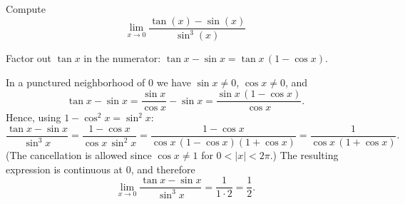 
\begin{question}
Compute
\[ \lim_{x\to0}\frac{\tan(x)-\sin(x)}{\sin^3(x)} \]
\end{question}

\begin{hint}
Factor out $\tan x$ in the numerator: $\tan x-\sin x=\tan x\,(1-\cos x)$.
\end{hint}

\begin{solution}
In a punctured neighborhood of $0$ we have $\sin x\neq0$, $\cos x\neq0$, and
\[ \tan x-\sin x=\frac{\sin x}{\cos x}-\sin x=\frac{\sin x\,(1-\cos x)}{\cos x}. \]
Hence, using $1-\cos^2x=\sin^2x$:
\[ \frac{\tan x-\sin x}{\sin^3x}=\frac{1-\cos x}{\cos x\,\sin^2x}=\frac{1-\cos x}{\cos x\,(1-\cos x)(1+\cos x)}=\frac{1}{\cos x\,(1+\cos x)}. \]
(The cancellation is allowed since $\cos x\neq1$ for $0<|x|<2\pi$.) The resulting expression is continuous at $0$, and therefore
\[ \lim_{x\to0}\frac{\tan x-\sin x}{\sin^3x}=\frac{1}{1\cdot2}=\boxed{\frac12}. \]
\end{solution}
